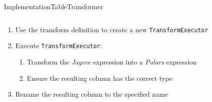 \begin{frame}[t]{Implementation}{TableTransformer}
	\begin{columns}[T]
		\begin{column}{0.5\linewidth}
			\begin{enumerate}[<+(1)->]
				\item Use the transform definition to create a new \Verb|TransformExecutor|
				\item Execute \Verb|TransformExecutor|:
				      \begin{enumerate}
					      \item Transform the \emph{Jayvee} expression into a \emph{Polars} expression
					      \item Ensure the resulting column has the correct type
				      \end{enumerate}
				\item Rename the resulting column to the specified name
			\end{enumerate}
		\end{column}
		\begin{column}{0.5\linewidth}
			
		\end{column}
	\end{columns}

\end{frame}
